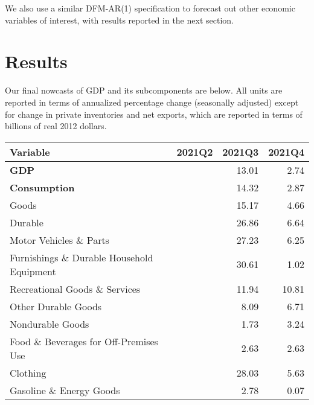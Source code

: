 \documentclass[11pt, letterpaper]{article}\usepackage[]{graphicx}\usepackage[]{color}
\begin{document}
We also use a similar DFM-AR(1) specification to forecast out other economic variables of interest, with results reported in the next section.


\section{Results}
Our final nowcasts of GDP and its subcomponents are below. All units are reported in terms of annualized percentage change (seasonally adjusted) except for change in private inventories and net exports, which are reported in terms of billions of real 2012 dollars.
\begin{table}[H]
\centering
\begingroup\fontsize{10pt}{12pt}\selectfont
\begin{tabular}{lrrr}
  \hline
Variable & 2021Q2 & 2021Q3 & 2021Q4 \\ 
  \hline
\hspace{0mm} \textbf{GDP} &  & 13.01 & 2.74 \\ 
  \hspace{0mm} \textbf{Consumption} &  & 14.32 & 2.87 \\ 
  \hspace{8mm}  Goods &  & 15.17 & 4.66 \\ 
  \hspace{16mm}  Durable &  & 26.86 & 6.64 \\ 
  \hspace{24mm}  Motor Vehicles \& Parts &  & 27.23 & 6.25 \\ 
  \hspace{24mm}  Furnishings \& Durable Household Equipment &  & 30.61 & 1.02 \\ 
  \hspace{24mm}  Recreational Goods \& Services &  & 11.94 & 10.81 \\ 
  \hspace{24mm}  Other Durable Goods &  & 8.09 & 6.71 \\ 
  \hspace{16mm}  Nondurable Goods &  & 1.73 & 3.24 \\ 
  \hspace{24mm}  Food \& Beverages for Off-Premises Use &  & 2.63 & 2.63 \\ 
  \hspace{24mm}  Clothing &  & 28.03 & 5.63 \\ 
  \hspace{24mm}  Gasoline \& Energy Goods &  & 2.78 & 0.07 \\ 

\end{tabular}
\end{table}
\end{document}
